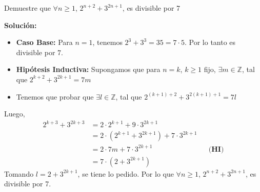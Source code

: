 \documentclass[12pt]{book}
\begin{document}
\begin{prob}{}{}
Demuestre que $\forall n \geq 1$, $2^{n+2} + 3^{2n+1}$, es divisible por 7
\end{prob}
\textbf{Solución:}
\begin{itemize}
    \item \textbf{Caso Base:} Para $n=1$, tenemos $2^{3}+3^3=35=7\cdot 5$. Por lo tanto es divisible por 7.

     \item \textbf{Hipótesis Inductiva:} Supongamos que para $n=k$, $k\geq 1$ fijo, $\exists m \in \mathbb{Z}$, tal que $2^{k+2} + 3^{2k+1}=7m$ 

     \item Tenemos que probar que $\exists l \in \mathbb{Z}$, tal que $2^{(k+1)+2} + 3^{2(k+1)+1}=7l$
\end{itemize}
Luego,
\begin{align*}
    2^{k+3}+3^{2k+3}&=2 \cdot 2^{k+1}+9 \cdot 3^{2k+1} \\
    &=2\cdot (2^{k+1}+3^{2k+1})+7\cdot 3^{2k+1} \\
    &=2\cdot 7m+7\cdot 3^{2k+1} && \textbf{(HI)} \\
    &=7\cdot(2+3^{2k+1}) 
\end{align*}
Tomando $l=2+3^{2k+1}$, se tiene lo pedido. Por lo que $\forall n \geq 1$, $2^{n+2} + 3^{2n+1}$, es divisible por 7.
\end{document}
